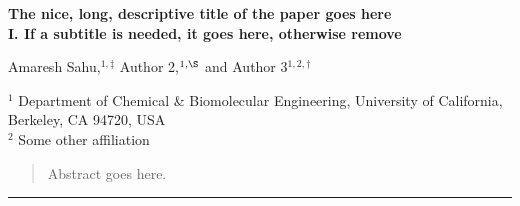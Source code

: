 \documentclass[11pt,twoside,notitlepage]{article}
\begin{document}

	\begin{center}
		{\textbf{
			\Large{The nice, long, descriptive title of the paper goes here}
		}} \\
		\vspace{0.11in}
		{\textbf{
			\large{I. If a subtitle is needed, it goes here, otherwise remove}
		}} \\
		\vspace{0.21in}

		{\small
			Amaresh Sahu,$^{1, \ddag}$
			Author 2,$^{1, \S}$
			and Author 3$^{1,2, \dag}$ \\
		}
		\vspace{0.25in}

		\footnotesize{
			{
				$^1$
				Department of Chemical \& Biomolecular Engineering,
				University of California, Berkeley, CA 94720, USA
				\\[3pt]
				$^2$
				Some other affiliation
				\\
			}
		}
	\end{center}



	\vspace{13pt}

	\begin{abstract}
		Abstract goes here.
		\lipsum[1]
	\end{abstract}
	\vspace{15pt}
				   



	\noindent\rule{4.6cm}{0.4pt}

	\small



	\vspace{25pt}

	{ \hypersetup{linkcolor=black} \tableofcontents }
	\vspace{20pt}




	








	
	
\end{document}

